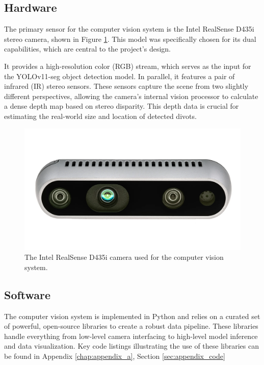 \subsection{Hardware}
\label{ssec:cv_hardware}
The primary sensor for the computer vision system is the Intel RealSense D435i stereo camera, shown in Figure \ref{fig:realsense_camera}. This model was specifically chosen for its dual capabilities, which are central to the project's design.

It provides a high-resolution color (RGB) stream, which serves as the input for the YOLOv11-seg object detection model. In parallel, it features a pair of infrared (IR) stereo sensors. These sensors capture the scene from two slightly different perspectives, allowing the camera's internal vision processor to calculate a dense depth map based on stereo disparity. This depth data is crucial for estimating the real-world size and location of detected divots. 

\begin{figure}[h!]
    \centering
    \includegraphics[width=0.6\linewidth]{figures/camera.png}
    \caption{The Intel RealSense D435i camera used for the computer vision system.}
    \label{fig:realsense_camera}
\end{figure}

\subsection{Software}
\label{ssec:cv_software}
The computer vision system is implemented in Python and relies on a curated set of powerful, open-source libraries to create a robust data pipeline. These libraries handle everything from low-level camera interfacing to high-level model inference and data visualization. Key code listings illustrating the use of these libraries can be found in Appendix \ref{chap:appendix_a}, Section \ref{sec:appendix_code}

